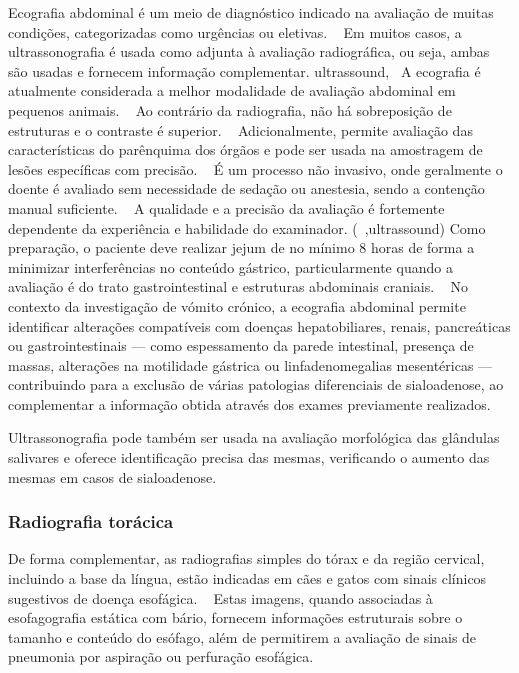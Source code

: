 Ecografia abdominal é um meio de diagnóstico indicado na avaliação de muitas condições, categorizadas como urgências ou eletivas. ~\cite{penninck_atlas_2015} Em muitos casos, a ultrassonografia é usada como adjunta à avaliação radiográfica, ou seja, ambas são usadas e fornecem informação complementar. ultrassound,~\cite{penninck_atlas_2015,mattoon_small_2015} A ecografia é atualmente considerada a melhor modalidade de avaliação abdominal em pequenos animais. ~\cite{barr_bsava_2011} Ao contrário da radiografia, não há sobreposição de estruturas e o contraste é superior. ~\cite{barr_bsava_2011} Adicionalmente, permite avaliação das características do parênquima dos órgãos e pode ser usada na amostragem de lesões específicas com precisão. ~\cite{barr_bsava_2011} É um processo não invasivo, onde geralmente o doente é avaliado sem necessidade de sedação ou anestesia, sendo a contenção manual suficiente. ~\cite{penninck_atlas_2015,seiler_acvr_2022} A qualidade e a precisão da avaliação é fortemente dependente da experiência e habilidade do examinador. (~\cite{barr_bsava_2011,Gommeren2022,barr_bsava_2011,penninck_atlas_2015},ultrassound) Como preparação, o paciente deve realizar jejum de no mínimo 8 horas de forma a minimizar interferências no conteúdo gástrico, particularmente quando a avaliação é do trato gastrointestinal e estruturas abdominais craniais. ~\cite{seiler_acvr_2022} No contexto da investigação de vómito crónico, a ecografia abdominal permite identificar alterações compatíveis com doenças hepatobiliares, renais, pancreáticas ou gastrointestinais — como espessamento da parede intestinal, presença de massas, alterações na motilidade gástrica ou linfadenomegalias mesentéricas — contribuindo para a exclusão de várias patologias diferenciais de sialoadenose, ao complementar a informação obtida através dos exames previamente realizados. ~\cite{penninck_atlas_2015,mattoon_small_2015,barr_bsava_2011}


Ultrassonografia pode também ser usada na avaliação morfológica das glândulas salivares e oferece identificação precisa das mesmas, verificando o aumento das mesmas em casos de sialoadenose. ~\cite{boydell_sialadenosis_2000,Gil2018}

\subsubsection{Radiografia torácica}


De forma complementar, as radiografias simples do tórax e da região cervical, incluindo a base da língua, estão indicadas em cães e gatos com sinais clínicos sugestivos de doença esofágica. ~\cite{thrall_textbook_2018} Estas imagens, quando associadas à esofagografia estática com bário, fornecem informações estruturais sobre o tamanho e conteúdo do esófago, além de permitirem a avaliação de sinais de pneumonia por aspiração ou perfuração esofágica. ~\cite{thrall_textbook_2018}



